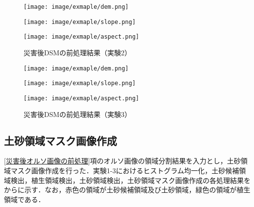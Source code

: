       \begin{figure}[t]
        \begin{minipage}[c]{0.329\hsize}
          \centering
          \texttt{[image: image/exmaple/dem.png]}
        \end{minipage}
        \begin{minipage}[c]{0.329\hsize}
          \centering
          \texttt{[image: image/exmaple/slope.png]}
        \end{minipage}
        \begin{minipage}[c]{0.329\hsize}
          \centering
          \texttt{[image: image/exmaple/aspect.png]}
        \end{minipage}
        \caption{災害後DSMの前処理結果（実験2）}
      \end{figure}

      \begin{figure}[t]
        \begin{minipage}[c]{0.329\hsize}
          \centering
          \texttt{[image: image/exmaple/dem.png]}
        \end{minipage}
        \begin{minipage}[c]{0.329\hsize}
          \centering
          \texttt{[image: image/exmaple/slope.png]}
        \end{minipage}
        \begin{minipage}[c]{0.329\hsize}
          \centering
          \texttt{[image: image/exmaple/aspect.png]}
        \end{minipage}
        \caption{災害後DSMの前処理結果（実験3）}
        \label{災害後DSMの前処理結果（実験3）}
      \end{figure}


    \subsection{土砂領域マスク画像作成}
      \label{土砂領域マスク画像作成（実験）}
      \ref{災害後オルソ画像の前処理}項のオルソ画像の領域分割結果を入力とし，土砂領域マスク画像作成を行った．実験1-3におけるヒストグラム均一化，土砂候補領域検出，植生領域検出，土砂領域検出，土砂領域マスク画像作成の各処理結果をからに示す．なお，赤色の領域が土砂候補領域及び土砂領域，緑色の領域が植生領域である．


